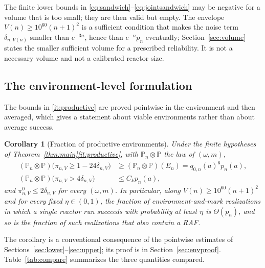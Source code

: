 \documentclass[11pt,letterpaper]{article}
\theoremstyle{plain}
\newtheorem{corollary}[theorem]{Corollary}
\theoremstyle{definition}
\theoremstyle{remark}
\numberwithin{equation}{section}
\newcommand{\PP}{\mathbb P}
\begin{document}
The finite lower bounds in \eqref{eq:sandwich}--\eqref{eq:jointsandwich} may be negative for a volume that is too small; they are then valid but empty. The envelope $V(n)\ge10^{60}(n+1)^2$ is a sufficient condition that makes the noise term $\delta_{n,V(n)}$ smaller than $e^{-3n}$, hence than $e^{-n}p_n$ eventually; Section~\ref{sec:volume} states the smaller sufficient volume for a prescribed reliability. It is not a necessary volume and not a calibrated reactor size.

\subsection{The environment-level formulation}
The bounds in \ref{it:productive} are proved pointwise in the environment and then averaged, which gives a statement about viable environments rather than about average success.

\begin{corollary}[Fraction of productive environments]\label{cor:environment}
Under the finite hypotheses of Theorem~\ref{thm:main}\ref{it:productive}, with $\PP_n\otimes\PP$ the law of $(\omega,m)$,
\begin{align}
 (\PP_n\otimes\PP)\bigl(\pi_{n,V}\ge1-24\delta_{n,V}\bigr)&\ge(\PP_n\otimes\PP)(E_n)=q_{0,n}(a)^6p_n(a),\label{eq:envlower}\\
 (\PP_n\otimes\PP)\bigl(\pi_{n,V}>4\delta_{n,V}\bigr)&\le C_kp_n(a),\label{eq:envupper}
\end{align}
and $\pi^0_{n,V}\le2\delta_{n,V}$ for every $(\omega,m)$. In particular, along $V(n)\ge10^{60}(n+1)^2$ and for every fixed $\eta\in(0,1)$, the fraction of environment-and-mark realizations in which a single reactor run succeeds with probability at least $\eta$ is $\Theta(p_n)$, and so is the fraction of such realizations that also contain a RAF.
\end{corollary}
The corollary is a conventional consequence of the pointwise estimates of Sections~\ref{sec:lower}--\ref{sec:upper}; its proof is in Section~\ref{sec:envproof}. Table~\ref{tab:compare} summarizes the three quantities compared.
\end{document}
